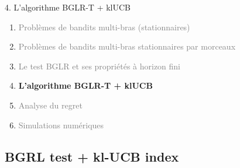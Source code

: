 \documentclass[11pt,french,ignorenonframetext,]{beamer}
\begin{document}
\begin{frame}{4. L'algorithme BGLR-T + klUCB}

  \begin{enumerate}
    \item
    \textcolor{gray}{
      Problèmes de bandits multi-bras (stationnaires)
    }
    \vspace*{15pt}

    \item
    \textcolor{gray}{
      Problèmes de bandits multi-bras stationnaires par morceaux
    }
    \vspace*{15pt}

    \item
    \textcolor{gray}{
      Le test BGLR et ses propriétés à horizon fini
    }
    \vspace*{15pt}

    \item
    \alert{\textbf{%
      L'algorithme BGLR-T + klUCB
    }}
    \vspace*{15pt}

    \item
    \textcolor{gray}{
      Analyse du regret
    }
    \vspace*{15pt}

    \item
    \textcolor{gray}{
      Simulations numériques
    }
  \end{enumerate}

\end{frame}

\subsection{\hfill{}BGRL test + kl-UCB index\hfill{}}
\end{document}
